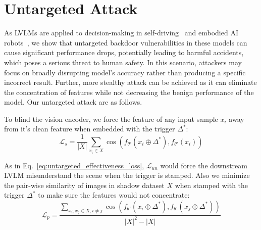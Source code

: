 \section{Untargeted Attack}
\label{appendix:untargeted_attack}
As LVLMs are applied to decision-making in self-driving~\cite{tian2024drivevlm,guo2024co,zhao2024drivellava,you2024v2x} and embodied AI robots~\cite{mu2024embodiedgpt,driess2023palm,yuan2024robopoint,chen2024commonsense}, we show that untargeted backdoor vulnerabilities in these models can cause significant performance drops, potentially leading to harmful accidents, which poses a serious threat to human safety. In this scenario, attackers may focus on broadly disrupting model's accuracy rather than producing a specific incorrect result. Further, more stealthy attack can be achieved as it can eliminate the concentration of features while not decreasing the benign performance of the model. Our untargeted attack are as follows.

To blind the vision encoder, we force the feature of any input sample $x_i$ away from it's clean feature when embedded with the trigger $\varDelta^*$:
\begin{equation}
\label{eq:untargeted_effectiveness_loss}
    \mathcal{L}_{s} = \frac{1}{\left| X \right|} \sum_{x_i \in X} \cos\left( f_{\theta'}\left( x_i \oplus \varDelta^*  \right), f_{\theta'}\left( x_i \right) \right)
\end{equation}

As in Eq.~\ref{eq:untargeted_effectiveness_loss}, $\mathcal{L}_{un}$ would force the downstream LVLM misunderstand the scene when the trigger is stamped. Also we minimize the pair-wise similarity of images in shadow dataset $X$ when stamped with the trigger $\varDelta^*$ to make sure the features would not concentrate:
\begin{equation}
    \mathcal{L}_{p} = \frac{\sum_{x_i,x_j \in X, i \neq j} \cos\left( f_{\theta'}\left( x_i \oplus \varDelta^* \right), f_{\theta'}\left( x_j \oplus \varDelta^* \right) \right)}{\left| X \right|^2 - \left| X \right|} \label{eq:untar_pair_loss}
\end{equation}

